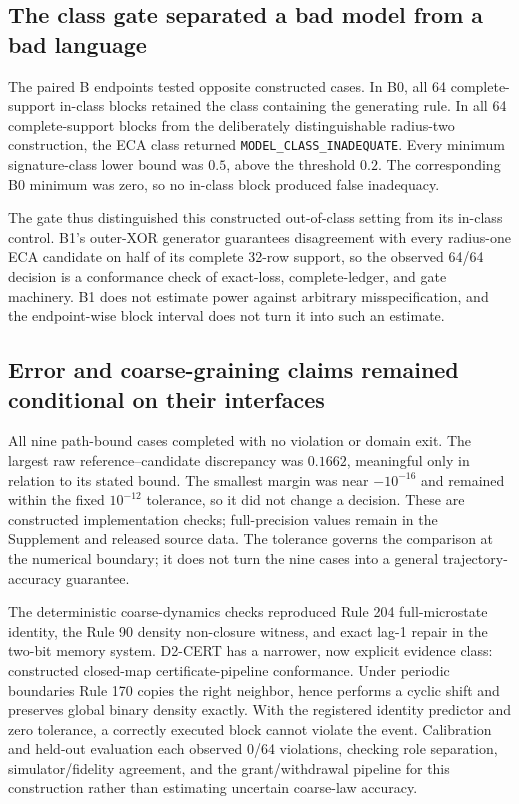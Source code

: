 \documentclass[10pt]{article}
\newcommand{\classbad}{\texttt{MODEL\_CLASS\_INADEQUATE}}
\theoremstyle{definition}
\begin{document}
\subsection{The class gate separated a bad model from a bad language}

The paired B endpoints tested opposite constructed cases. In B0, all 64 complete-support in-class blocks
retained the class containing the generating rule. In all 64 complete-support blocks from the
deliberately distinguishable radius-two construction, the ECA class returned \classbad. Every
minimum signature-class lower bound was \(0.5\), above the threshold \(0.2\).
The corresponding B0 minimum was zero, so no in-class block produced false inadequacy.

The gate thus distinguished this constructed out-of-class setting from its in-class control. B1's
outer-XOR generator guarantees disagreement with every radius-one ECA candidate on half of its
complete 32-row support, so the observed 64/64 decision is a conformance check of exact-loss,
complete-ledger, and gate machinery. B1 does not estimate power against arbitrary
misspecification, and the endpoint-wise block interval does not turn it into such an estimate.

\subsection{Error and coarse-graining claims remained conditional on their interfaces}

All nine path-bound cases completed with no violation or domain exit. The
largest raw reference--candidate discrepancy was \(0.1662\), meaningful only in
relation to its stated bound. The smallest margin was near \(-10^{-16}\) and remained within
the fixed \(10^{-12}\) tolerance, so it did not change a decision. These are constructed
implementation checks; full-precision values remain in the Supplement and released source data.
The tolerance governs the comparison at the numerical boundary; it does not turn the nine cases
into a general trajectory-accuracy guarantee.

The deterministic coarse-dynamics checks reproduced Rule 204 full-microstate identity, the Rule
90 density non-closure witness, and exact lag-1 repair in the two-bit memory system. D2-CERT has a
narrower, now explicit evidence class: constructed closed-map certificate-pipeline conformance.
Under periodic boundaries Rule 170 copies the right neighbor, hence performs a cyclic
shift and preserves global binary density exactly. With the registered identity predictor and
zero tolerance, a correctly executed block cannot violate the event. Calibration and held-out
evaluation each observed 0/64 violations, checking role separation, simulator/fidelity agreement,
and the grant/withdrawal pipeline for this construction rather than estimating uncertain
coarse-law accuracy.
\end{document}
